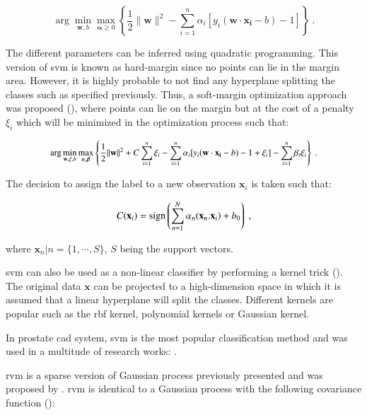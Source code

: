 \begin{enumerate}[leftmargin=*]
\begin{equation}
	\arg\min_{\mathbf{w},b } \max_{\boldsymbol{\alpha}\geq 0 } \left\{ \frac{1}{2}\|\mathbf{w}\|^2 - \sum_{i=1}^{n}{\alpha_i[y_i(\mathbf{w}\cdot \mathbf{x_i} - b)-1]} \right\} \ .
	\label{eq:svm2}
\end{equation}

The different parameters can be inferred using quadratic programming. This version of \ac{svm} is known as hard-margin since no points can lie in the margin area. However, it is highly probable to not find any hyperplane splitting the classes such as specified previously. Thus, a soft-margin optimization approach was proposed (\cite{Cortes1995}), where points can lie on the margin but at the cost of a penalty $\xi_i$ which will be minimized in the optimization process such that:

\begin{equation}
\small
\arg\min_{\mathbf{w},\mathbf{\xi}, b } \max_{\boldsymbol{\alpha},\boldsymbol{\beta} } \left\{ \frac{1}{2}\|\mathbf{w}\|^2+C \sum_{i=1}^n \xi_i - \sum_{i=1}^{n}{\alpha_i[y_i(\mathbf{w}\cdot \mathbf{x_i} - b) -1 + \xi_i]} - \sum_{i=1}^{n} \beta_i \xi_i \right\} \ .
\end{equation}

The decision to assign the label to a new observation $\mathbf{x}_i$ is taken such that:

\begin{equation}
	C(\mathbf{x}_i) = \operatorname*{sign} \left( \sum_{n=1}^{N} \alpha_n (\mathbf{x}_n . \mathbf{x}_i) + b_0 \right) \ ,
	\label{eq:svmdec} 
\end{equation}

\noindent where $\mathbf{x}_n|n=\{1,\cdots,S\}$, $S$ being the support vectors.

\ac{svm} can also be used as a non-linear classifier by performing a kernel trick (\cite{Boser1992}). The original data $\mathbf{x}$ can be projected to a high-dimension space in which it is assumed that a linear hyperplane will split the classes. Different kernels are popular such as the \ac{rbf} kernel, polynomial kernels or Gaussian kernel.

In prostate \ac{cad} system, \ac{svm} is the most popular classification method and was used in a multitude of research works: \cite{Artan2009,Artan2010,Chan2003,Kelm2007,Litjens2011,Litjens2012,Liu2013,Lopes2011,Niaf2011,Niaf2012,Ozer2009,Ozer2010,Parfait2012,Peng2013,Sung2011,Tiwari2012,Vos2008,Vos2008a,Vos2010,Vos2012}.

\Acf{rvm} is a sparse version of Gaussian process previously presented and was proposed by \cite{Tipping2001}. \ac{rvm} is identical to a Gaussian process with the following covariance function (\cite{Quinonero-Candela2002}):


\end{enumerate}

